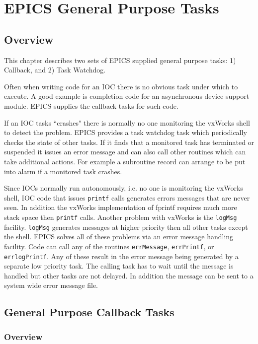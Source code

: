 \chapter{EPICS General Purpose Tasks}

\section{Overview}

This chapter describes two sets of EPICS supplied general purpose tasks: 1) Callback,  and 2) Task Watchdog.

Often when writing code for an IOC there is no obvious task under which to execute. A good example is completion code 
for an asynchronous device support module. EPICS supplies the callback tasks for such code.

If an IOC tasks ``crashes" there is normally no one monitoring the vxWorks shell to detect the problem. EPICS provides a 
task watchdog task which periodically checks the state of other tasks. If  it finds that a monitored task has terminated or 
suspended it issues an error message and can also call other routines which can take additional actions. For example a 
subroutine record can arrange to be put into alarm if a monitored task crashes.

Since IOCs normally run autonomously, i.e. no one is monitoring the vxWorks shell, IOC code that issues \verb|printf| calls 
generates errors messages that are never seen. In addition the vxWorks implementation of fprintf requires much more 
stack space then \verb|printf| calls. Another problem with vxWorks is the \verb|logMsg| facility. \verb|logMsg| generates messages at 
higher priority then all other tasks except the shell. EPICS solves all of these problems via an error message handling 
facility. Code can call any of the routines \verb|errMessage|, \verb|errPrintf|, or \verb|errlogPrintf|. Any of these result in the 
error message being generated by a separate low priority task. The calling task has to wait until the message is handled but 
other tasks are not delayed. In addition the message can be sent to a system wide error message file.

\section{General Purpose Callback Tasks}
\label{sec:callbackThreads}

\subsection{Overview}

